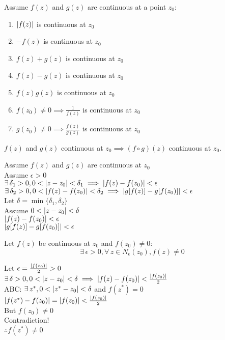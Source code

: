 \documentclass[letterpaper,12pt,fleqn]{article}
\renewcommand{\d}{\delta}
\newcommand{\e}{\epsilon}
\begin{document}
\begin{theorem}
  Assume $f(z)$ and $g(z)$ are continuous at a point $z_0$:
  \begin{enumerate}
  \item $\lvert f(z)\rvert$ is continuous at $z_0$
  \item $-f(z)$ is continuous at $z_0$
  \item $f(z)+g(z)$ is continuous at $z_0$
  \item $f(z)-g(z)$ is continuous at $z_0$
  \item $f(z)g(z)$ is continuous at $z_0$
  \item $f(z_0)\ne0\implies\frac{1}{f(z)}$ is continuous at $z_0$
  \item $g(z_0)\ne0\implies\frac{f(z)}{g(z)}$ is continuous at $z_0$
  \end{enumerate}
\end{theorem}

\begin{theorem}
  $f(z)$ and $g(z)$ continuous at $z_0\implies (f\circ g)(z)$ continuous at
  $z_0$.
\end{theorem}

\begin{theproof}
  Assume $f(z)$ and $g(z)$ are continuous at $z_0$ \\
  Assume $\e>0$ \\
  $\exists\,\d_1>0,0<\abs{z-z_0}<\d_1\implies\abs{f(z)-f(z_0)}<\e$ \\
  $\exists\,\d_2>0,0<\abs{f(z)-f(z_0)}<\d_2\implies
  \abs{g[f(z)]-g[f(z_0)]}<\e$ \\
  Let $\d=\min\{\d_1,\d_2\}$ \\
  Assume $0<\abs{z-z_0}<\d$ \\
  $\abs{f(z)-f(z_0)}<\e$ \\
  $\abs{g[f(z)]-g[f(z_0)]}<\e$
\end{theproof}

\begin{theorem}
  Let $f(z)$ be continuous at $z_0$ and $f(z_0)\ne0$:
  \[\exists\,\e>0,\forall\,z\in N_{\e}(z_0),f(z)\ne 0\]
\end{theorem}

\begin{theproof}
  Let $\e=\frac{\abs{f(z_0)}}{2}>0$ \\
  $\exists\,\d>0,0<\abs{z-z_0}<\d\implies\abs{f(z)-f(z_0)}<
  \frac{\abs{f(z_0)}}{2}$ \\
  ABC: $\exists\,z^*,0<\abs{z^*-z_0}<\d$ and $f(z^*)=0$ \\
  $\lvert f(z^*)-f(z_0)\rvert=\lvert f(z_0)\rvert<\frac{\lvert f(z_0)\rvert}{2}$ \\
  But $f(z_0)\ne0$ \\
  Contradiction! \\
  $\therefore f(z^*)\ne0$
\end{theproof}
\end{document}
